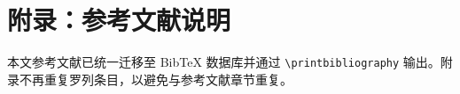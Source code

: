 \section*{附录：参考文献说明}
本文参考文献已统一迁移至 BibTeX 数据库并通过 \verb|\printbibliography| 输出。附录不再重复罗列条目，以避免与参考文献章节重复。
